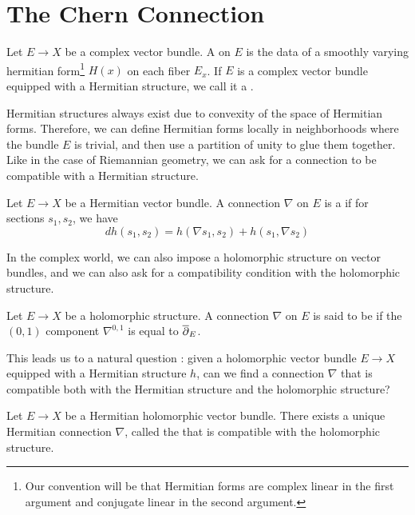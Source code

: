 \section{The Chern Connection}
%
\begin{defn}
Let $E \to X$ be a complex vector bundle. A  on $E$
is the data of a smoothly varying hermitian form\footnote{Our convention will be that
Hermitian forms are complex linear in the first argument and conjugate linear in the
second argument.} $H(x)$ on each fiber $E_x$. If $E$ is a complex vector bundle equipped
with a Hermitian structure, we call it a .
\end{defn}
%
Hermitian structures always exist due to convexity of the space of Hermitian forms.
Therefore, we can define Hermitian forms locally in neighborhoods where the bundle
$E$ is trivial, and then use a partition of unity to glue them together.
%
Like in the case of Riemannian geometry, we can ask for a connection to be compatible
with a Hermitian structure.
%
\begin{defn}
Let $E \to X$ be a Hermitian vector bundle. A connection $\nabla$ on $E$ is a
 if for sections $s_1, s_2$, we have
\[
dh(s_1,s_2) = h(\nabla s_1, s_2) + h(s_1,\nabla s_2)
\]
\end{defn}
%
In the complex world, we can also impose a holomorphic structure on vector bundles,
and we can also ask for a compatibility condition with the holomorphic structure.
%
\begin{defn}
Let $E \to X$ be a holomorphic structure. A connection $\nabla$ on $E$ is said
to be  if the $(0,1)$ component
$\nabla^{0,1}$ is equal to $\overline{\partial}_E$.
\end{defn}
%
This leads us to a natural question : given a holomorphic vector bundle $E \to X$
equipped with a Hermitian structure $h$, can we find a connection $\nabla$ that
is compatible both with the Hermitian structure and the holomorphic structure?
%
\begin{thm}
Let $E \to X$ be a Hermitian holomorphic vector bundle. There exists a unique
Hermitian connection $\nabla$, called the  that is compatible
with the holomorphic structure.
\end{thm}
%
